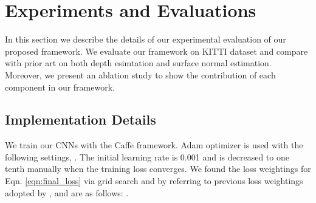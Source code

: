 \documentclass[letterpaper, 10 pt, conference]{ieeeconf}
\begin{document}
\section{Experiments and Evaluations} \label{sec:exp_eval}
In this section we describe the details of our experimental evaluation of our proposed framework. We evaluate our framework on KITTI dataset \cite{Geiger2012kitti}\cite{Geiger2013kitti} and compare with prior art on both depth esimtation and surface normal estimation.
Moreover, we present an ablation study to show the contribution of each component in our framework.

\subsection{Implementation Details} \label{sec:implementation}
We train our CNNs with the Caffe \cite{jia2014caffe} framework. Adam optimizer \cite{kingma2014adam} is used with the following settings, . The initial learning rate is 0.001 and is decreased to one tenth manually when the training loss converges. 
We found the loss weightings for Eqn. \eqref{eqn:final_loss} via grid search and by referring to previous loss weightings adopted by \cite{weerasekera2017normals,zhan2018depthVO}, and are as follows: .
\end{document}
